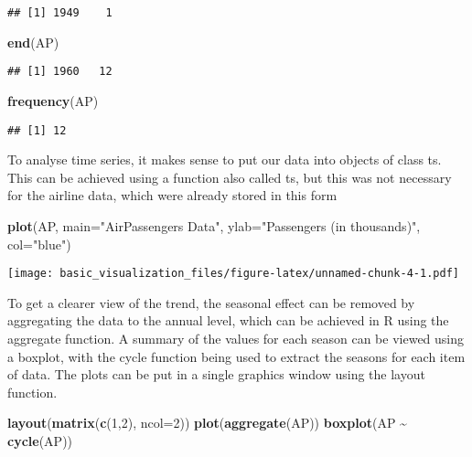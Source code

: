 \documentclass[
]{article}
\newenvironment{Shaded}{\begin{snugshade}}{\end{snugshade}}
\newcommand{\AttributeTok}[1]{\textcolor[rgb]{0.13,0.29,0.53}{#1}}
\newcommand{\DecValTok}[1]{\textcolor[rgb]{0.00,0.00,0.81}{#1}}
\newcommand{\FunctionTok}[1]{\textcolor[rgb]{0.13,0.29,0.53}{\textbf{#1}}}
\newcommand{\NormalTok}[1]{#1}
\newcommand{\SpecialCharTok}[1]{\textcolor[rgb]{0.81,0.36,0.00}{\textbf{#1}}}
\newcommand{\StringTok}[1]{\textcolor[rgb]{0.31,0.60,0.02}{#1}}
\begin{document}
\begin{verbatim}
## [1] 1949    1
\end{verbatim}

\begin{Shaded}
\begin{Highlighting}[]
\FunctionTok{end}\NormalTok{(AP)}
\end{Highlighting}
\end{Shaded}

\begin{verbatim}
## [1] 1960   12
\end{verbatim}

\begin{Shaded}
\begin{Highlighting}[]
\FunctionTok{frequency}\NormalTok{(AP)}
\end{Highlighting}
\end{Shaded}

\begin{verbatim}
## [1] 12
\end{verbatim}

To analyse time series, it makes sense to put our data into objects of
class ts. This can be achieved using a function also called ts, but this
was not necessary for the airline data, which were already stored in
this form

\begin{Shaded}
\begin{Highlighting}[]
\FunctionTok{plot}\NormalTok{(AP,  }\AttributeTok{main=}\StringTok{"AirPassengers Data"}\NormalTok{, }\AttributeTok{ylab=}\StringTok{"Passengers (in thousands)"}\NormalTok{, }\AttributeTok{col=}\StringTok{"blue"}\NormalTok{)}
\end{Highlighting}
\end{Shaded}

\texttt{[image: basic\_visualization\_files/figure-latex/unnamed-chunk-4-1.pdf]}

To get a clearer view of the trend, the seasonal effect can be removed
by aggregating the data to the annual level, which can be achieved in R
using the aggregate function. A summary of the values for each season
can be viewed using a boxplot, with the cycle function being used to
extract the seasons for each item of data. The plots can be put in a
single graphics window using the layout function.

\begin{Shaded}
\begin{Highlighting}[]
\FunctionTok{layout}\NormalTok{(}\FunctionTok{matrix}\NormalTok{(}\FunctionTok{c}\NormalTok{(}\DecValTok{1}\NormalTok{,}\DecValTok{2}\NormalTok{), }\AttributeTok{ncol=}\DecValTok{2}\NormalTok{))}
\FunctionTok{plot}\NormalTok{(}\FunctionTok{aggregate}\NormalTok{(AP))}
\FunctionTok{boxplot}\NormalTok{(AP }\SpecialCharTok{\textasciitilde{}} \FunctionTok{cycle}\NormalTok{(AP))}
\end{Highlighting}
\end{Shaded}
\end{document}
